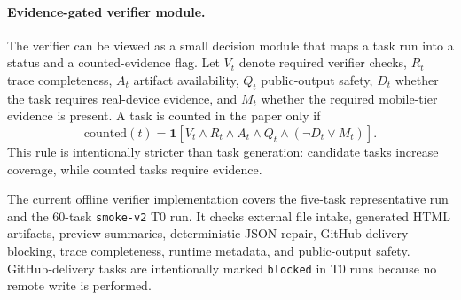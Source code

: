 \documentclass{article}
\begin{document}
\paragraph{Evidence-gated verifier module.}
The verifier can be viewed as a small decision module that maps a task run into a status and a counted-evidence flag.
Let \(V_t\) denote required verifier checks, \(R_t\) trace completeness, \(A_t\) artifact availability, \(Q_t\) public-output safety, \(D_t\) whether the task requires real-device evidence, and \(M_t\) whether the required mobile-tier evidence is present.
A task is counted in the paper only if
\[
\mathrm{counted}(t)=\mathbf{1}[V_t \land R_t \land A_t \land Q_t \land (\neg D_t \lor M_t)].
\]
This rule is intentionally stricter than task generation: candidate tasks increase coverage, while counted tasks require evidence.
\begin{center}
{\setlength{\fboxsep}{4pt}
}
\end{center}

The current offline verifier implementation covers the five-task representative run and the 60-task \texttt{smoke-v2} T0 run.
It checks external file intake, generated HTML artifacts, preview summaries, deterministic JSON repair, GitHub delivery blocking, trace completeness, runtime metadata, and public-output safety.
GitHub-delivery tasks are intentionally marked \texttt{blocked} in T0 runs because no remote write is performed.
\end{document}
